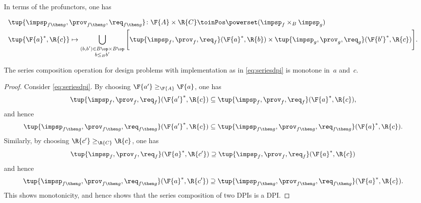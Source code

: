{\begin{definition}
\begin{equation}
        \end{equation}
        In terms of the profunctors, one has
        \begin{widepar}
            \begin{equation}
                \label{eq:seriesdpi}
                \begin{aligned}
                     & \tup{\impsp_{f\then g},\prov_{f\then g},\req_{f\then g}}\colon \F{A}\times \R{C} \toinPos \powerset(\impsp_f \times_B \impsp_g) \\
                     & \tup{\F{a}^*,\R{c}} \mapsto \bigcup_{\substack{(b,b') \in B\op \times B\op                                                      \\ b \leq_B b'}} \Bigg[ \tup{\impsp_f,\prov_f,\req_f}(\F{a}^*,\R{b}) \times \tup{\impsp_g,\prov_g,\req_g}(\F{b'}^*,\R{c}) \Bigg].                     
                \end{aligned}
            \end{equation}
        \end{widepar}
    \end{definition}

    \begin{lemma}
        The series composition operation for design problems with implementation as in \cref{eq:seriesdpi} is monotone in~$a$ and~$c$.
    \end{lemma}
    \begin{proof}
        Consider \cref{eq:seriesdpi}.
        By choosing $\F{a'}\geq_\F{A} \F{a}$, one has
        \begin{equation}
            \tup{\impsp_{f},\prov_{f},\req_{f}}(\F{a'}^*,\R{c})\subseteq \tup{\impsp_{f},\prov_{f},\req_{f}}(\F{a}^*,\R{c}),
        \end{equation}
        and hence
        \begin{equation}
            \tup{\impsp_{f\then g},\prov_{f\then g},\req_{f\then g}}(\F{a'}^*,\R{c})\subseteq \tup{\impsp_{f\then g},\prov_{f\then g},\req_{f\then g}}(\F{a}^*,\R{c}).
        \end{equation}
        Similarly, by choosing $\R{c'}\geq_{\R{C}} \R{c}$, one has
        \begin{equation}
            \tup{\impsp_{f},\prov_{f},\req_{f}}(\F{a}^*,\R{c'})\supseteq \tup{\impsp_{f},\prov_{f},\req_{f}}(\F{a}^*,\R{c})
        \end{equation}
        and hence
        \begin{equation}
            \tup{\impsp_{f\then g},\prov_{f\then g},\req_{f\then g}}(\F{a}^*,\R{c'})\supseteq \tup{\impsp_{f\then g},\prov_{f\then g},\req_{f\then g}}(\F{a}^*,\R{c}).
        \end{equation}
        This shows monotonicity, and hence shows that the series composition of two DPIs is a DPI.
    \end{proof}

}
